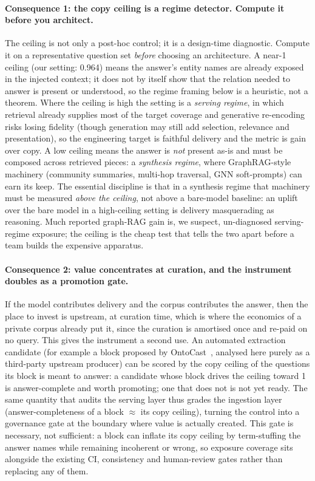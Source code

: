 \documentclass[10pt,twocolumn]{article}
\begin{document}
\paragraph{Consequence 1: the copy ceiling is a regime detector. Compute it before you architect.}
The ceiling is not only a post-hoc control; it is a design-time diagnostic. Compute it on a
representative question set \emph{before} choosing an architecture. A near-1 ceiling (our setting:
0.964) means the answer's entity names are already exposed in the injected context; it does not by
itself show that the relation needed to answer is present or understood, so the regime framing below is
a heuristic, not a theorem. Where the ceiling is high the setting is a \emph{serving regime}, in which
retrieval already supplies most of the target coverage and generative re-encoding risks losing
fidelity (though generation may still add selection, relevance and presentation), so the engineering
target is faithful delivery and the metric is gain over copy. A low ceiling means the answer is \emph{not}
present as-is and must be composed across retrieved pieces: a \emph{synthesis regime}, where
GraphRAG-style machinery (community summaries, multi-hop traversal, GNN soft-prompts) can earn its
keep. The essential discipline is that in a synthesis regime that machinery must be measured
\emph{above the ceiling}, not above a bare-model baseline: an uplift over the bare model in a
high-ceiling setting is delivery masquerading as reasoning. Much reported graph-RAG gain is, we
suspect, un-diagnosed serving-regime exposure; the ceiling is the cheap test that tells the two apart
before a team builds the expensive apparatus.

\paragraph{Consequence 2: value concentrates at curation, and the instrument doubles as a promotion
gate.} If the model contributes delivery and the corpus contributes the answer, then the place to invest is
upstream, at curation time, which is where the economics of a private corpus already put it, since the
curation is amortised once and re-paid on no query. This gives the instrument a second use. An
automated extraction candidate (for example a block proposed by OntoCast~\cite{ontocast}, analysed here
purely as a third-party upstream producer) can be scored by the copy ceiling of the questions its block
is meant to answer: a candidate whose block drives the ceiling toward 1 is answer-complete and worth
promoting; one that does not is not yet ready. The same quantity that audits the serving layer thus
grades the ingestion layer (answer-completeness of a block $\approx$ its copy ceiling), turning the
control into a governance gate at the boundary where value is actually created. This gate is necessary,
not sufficient: a block can inflate its copy ceiling by term-stuffing the answer names while remaining
incoherent or wrong, so exposure coverage sits alongside the existing CI, consistency and human-review
gates rather than replacing any of them.
\end{document}
